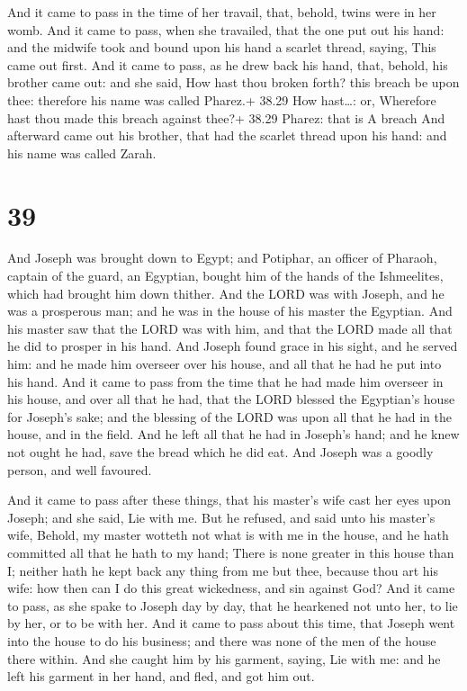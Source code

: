  And it came to pass in the time of her travail, that,
behold, twins were in her womb.  And it came to pass, when
she travailed, that the one put out his hand: and the midwife took and
bound upon his hand a scarlet thread, saying, This came out first.
 And it came to pass, as he drew back his hand, that,
behold, his brother came out: and she said, How hast thou broken forth?
this breach be upon thee: therefore his name was called Pharez.+ 38.29
How hast\ldots: or, Wherefore hast thou made this breach against thee?+
38.29 Pharez: that is A breach  And afterward came out his
brother, that had the scarlet thread upon his hand: and his name was
called Zarah.

\hypertarget{section-38}{%
\section{39}\label{section-38}}

 And Joseph was brought down to Egypt; and Potiphar, an
officer of Pharaoh, captain of the guard, an Egyptian, bought him of the
hands of the Ishmeelites, which had brought him down thither.
 And the LORD was with Joseph, and he was a prosperous man;
and he was in the house of his master the Egyptian.  And his
master saw that the LORD was with him, and that the LORD made all that
he did to prosper in his hand.  And Joseph found grace in
his sight, and he served him: and he made him overseer over his house,
and all that he had he put into his hand.  And it came to
pass from the time that he had made him overseer in his house, and over
all that he had, that the LORD blessed the Egyptian's house for Joseph's
sake; and the blessing of the LORD was upon all that he had in the
house, and in the field.  And he left all that he had in
Joseph's hand; and he knew not ought he had, save the bread which he did
eat. And Joseph was a goodly person, and well favoured.

 And it came to pass after these things, that his master's
wife cast her eyes upon Joseph; and she said, Lie with me. 
But he refused, and said unto his master's wife, Behold, my master
wotteth not what is with me in the house, and he hath committed all that
he hath to my hand;  There is none greater in this house
than I; neither hath he kept back any thing from me but thee, because
thou art his wife: how then can I do this great wickedness, and sin
against God?  And it came to pass, as she spake to Joseph
day by day, that he hearkened not unto her, to lie by her, or to be with
her.  And it came to pass about this time, that Joseph went
into the house to do his business; and there was none of the men of the
house there within.  And she caught him by his garment,
saying, Lie with me: and he left his garment in her hand, and fled, and
got him out.

